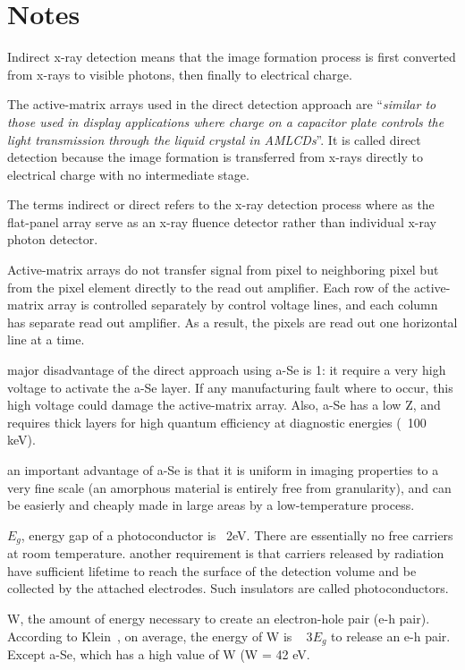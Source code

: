 \section{Notes}

Indirect x-ray detection means that the image formation process is first converted from x-rays to visible photons, then finally to electrical charge.

The active-matrix arrays used in the direct detection approach are ``\textit{similar to those used in display applications where charge on a capacitor plate controls the light transmission through the liquid crystal in AMLCDs}''.  It is called direct detection because the image formation is transferred from x-rays directly to electrical charge with no intermediate stage.

The terms indirect or direct refers to the x-ray detection process where as the flat-panel array serve as an x-ray fluence detector rather than individual x-ray photon detector.

Active-matrix arrays do not transfer signal from pixel to neighboring pixel but from the pixel element directly to the read out amplifier.  Each row of the active-matrix array is controlled separately by control voltage lines, and each column has separate read out amplifier.  As a result, the pixels are read out one horizontal line at a time.

major disadvantage of the direct approach using a-Se is 1: it require a very high voltage to activate the a-Se layer.  If any manufacturing fault where to occur, this high voltage could damage the active-matrix array.  Also, a-Se has a low Z, and requires thick layers for high quantum efficiency at diagnostic energies (~100 keV).  

an important advantage of a-Se is that it is uniform in imaging properties to a very fine scale (an amorphous material is entirely free from granularity), and can be easierly and cheaply made in large areas by a low-temperature process.

$E_g$, energy gap of a photoconductor is ~2eV.  There are essentially no free carriers at room temperature.  another requirement is that carriers released by radiation have sufficient lifetime to reach the surface of the detection volume and be collected by the attached electrodes.  Such insulators are called photoconductors.

W, the amount of energy necessary to create an electron-hole pair (e-h pair).  According to Klein~\citep{Klein1969}, on average, the energy of W is ~ 3$E_g$ to release an e-h pair.  Except a-Se, which has a high value of W (W = 42 eV.

